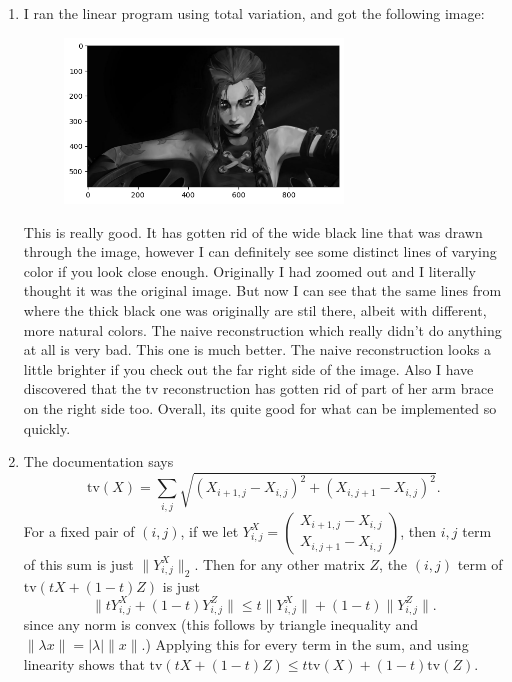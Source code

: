\documentclass[12pt]{article}
\begin{document}
\begin{enumerate}[label=(\alph*)]
        \item I ran the linear program using total variation, and got the following image:
        \begin{figure}[H]
            \centering
            \includegraphics[width=0.7\textwidth]{tv_recovery.png}
        \end{figure}
        This is really good. It has gotten rid of the wide black line that was drawn through the image, however I can definitely see some distinct lines of varying color if you look close enough. Originally I had zoomed out and I literally thought it was the original image. But now I can see that the same lines from where the thick black one was originally are stil there, albeit with different, more natural colors. The naive reconstruction which really didn't do anything at all is very bad. This one is much better. The naive reconstruction looks a little brighter if you check out the far right side of the image. Also I have discovered that the tv reconstruction has gotten rid of part of her arm brace on the right side too. Overall, its quite good for what can be implemented so quickly.


        \item The documentation says $$\mathrm{tv}(X) = \sum_{i,j} \sqrt{(X_{i+1,j} - X_{i,j})^2 + (X_{i,j+1} - X_{i,j})^2}.$$
        For a fixed pair of $(i,j)$, if we let $Y^X_{i,j} = \begin{pmatrix} X_{i+1,j} - X_{i,j} \\ X_{i,j+1} - X_{i,j} \end{pmatrix}$, then $i,j$ term of this sum is just $\|Y^X_{i,j}\|_2$. Then for any other matrix $Z$, the $(i,j)$ term of $\mathrm{tv}(tX + (1-t)Z)$ is just $$\|tY^X_{i,j} + (1-t)Y^Z_{i,j}\| \leq t\|Y^X_{i,j}\| + (1-t)\|Y^Z_{i,j}\|.$$ since any norm is convex (this follows by triangle inequality and $\|\lambda x\| = |\lambda| \|x\|$.) Applying this for every term in the sum, and using linearity shows that $\mathrm{tv}(tX + (1-t)Z) \leq t\mathrm{tv}(X) + (1-t)\mathrm{tv}(Z)$.


\end{enumerate}
\end{document}

